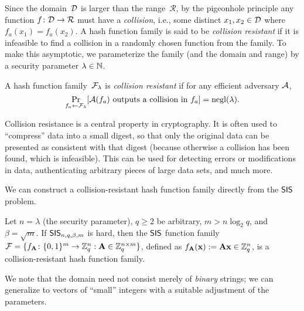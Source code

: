 \documentclass[11pt]{article}
\newcommand{\calR}{\ensuremath{\mathcal{R}}}
\begin{document}
Since the domain~$\mathcal{D}$ is larger than the range~$\calR$, by the
pigeonhole principle any function $f \colon \calD \to \calR$ must have
a \emph{collision}, i.e., some distinct $x_1, x_2 \in \mathcal{D}$ where
$f_a(x_1)=f_a(x_2)$. A hash function family is said to be
\emph{collision resistant} if it is infeasible to find a collision in
a randomly chosen function from the family. To make this asymptotic,
we parameterize the family (and the domain and range) by a security
parameter $\lambda \in \mathbb{N}$.

\begin{definition}
  A hash function family~$\mathcal{F}_{\lambda}$ is \emph{collision
    resistant} if for any efficient adversary $\mathcal{A}$,
  \[ \Pr_{f_a \gets \mathcal{F}_{\lambda}}[\mathcal{A}(f_a) \text{ outputs a
      collision in $f_{a}$}] = \operatorname{negl}(\lambda) . \]
\end{definition}

Collision resistance is a central property in cryptography. It is
often used to ``compress'' data into a small digest, so that only the
original data can be presented as consistent with that digest (because
otherwise a collision has been found, which is infeasible). This can
be used for detecting errors or modifications in data, authenticating
arbitrary pieces of large data sets, and much more.

We can construct a collision-resistant hash function family directly
from the $\mathsf{SIS}$ problem.
\begin{theorem}
  Let $n=\lambda$ (the security parameter), $q \geq 2$ be arbitrary,
  $m > n \log_{2} q$, and $\beta=\sqrt{m}$. If $\mathsf{SIS}_{n,q,\beta,m}$ is
  hard, then the $\mathsf{SIS}$ function family
  $\mathcal{F}=\{f_{\mathbf{A}} \colon \{0,1\}^{m} \to \mathbb{Z}_q^{n} : \mathbf{A} \in \mathbb{Z}_q^{n
      \times m}\}$, defined as
  $f_{\mathbf{A}}(\mathbf{x}):=\mathbf{A}\mathbf{x} \in \mathbb{Z}_q^{n}$, is a collision-resistant
  hash function family.
\end{theorem}

We note that the domain need not consist merely of \emph{binary}
strings; we can generalize to vectors of ``small'' integers with a
suitable adjustment of the parameters.
\end{document}
